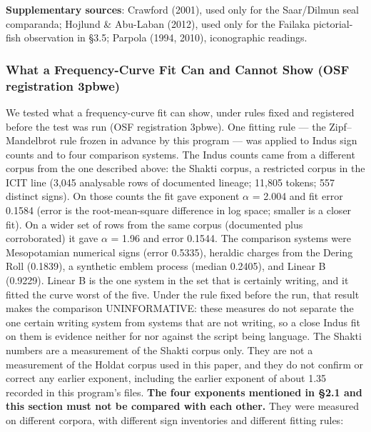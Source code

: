 \documentclass[11pt]{article}
\begin{document}
\textbf{Supplementary sources}: Crawford (2001), used only for the Saar/Dilmun seal comparanda; Hojlund \& Abu-Laban (2012), used only for the Failaka pictorial-fish observation in §3.5; Parpola (1994, 2010), iconographic readings.

\subsubsection{What a Frequency-Curve Fit Can and Cannot Show (OSF registration 3pbwe)}\label{what-a-frequency-curve-fit-can-and-cannot-show-spec-068}

We tested what a frequency-curve fit can show, under rules fixed and registered before the test was run (OSF registration 3pbwe). One fitting rule --- the Zipf--Mandelbrot rule frozen in advance by this program --- was applied to Indus sign counts and to four comparison systems. The Indus counts came from a different corpus from the one described above: the Shakti corpus, a restricted corpus in the ICIT line (3,045 analysable rows of documented lineage; 11,805 tokens; 557 distinct signs). On those counts the fit gave exponent $\alpha$ = 2.004 and fit error 0.1584 (error is the root-mean-square difference in log space; smaller is a closer fit). On a wider set of rows from the same corpus (documented plus corroborated) it gave $\alpha$ = 1.96 and error 0.1544. The comparison systems were Mesopotamian numerical signs (error 0.5335), heraldic charges from the Dering Roll (0.1839), a synthetic emblem process (median 0.2405), and Linear B (0.9229). Linear B is the one system in the set that is certainly writing, and it fitted the curve worst of the five. Under the rule fixed before the run, that result makes the comparison UNINFORMATIVE: these measures do not separate the one certain writing system from systems that are not writing, so a close Indus fit on them is evidence neither for nor against the script being language. The Shakti numbers are a measurement of the Shakti corpus only. They are not a measurement of the Holdat corpus used in this paper, and they do not confirm or correct any earlier exponent, including the earlier exponent of about 1.35 recorded in this program's files. \textbf{The four exponents mentioned in §2.1 and this section must not be compared with each other.} They were measured on different corpora, with different sign inventories and different fitting rules:
\end{document}
